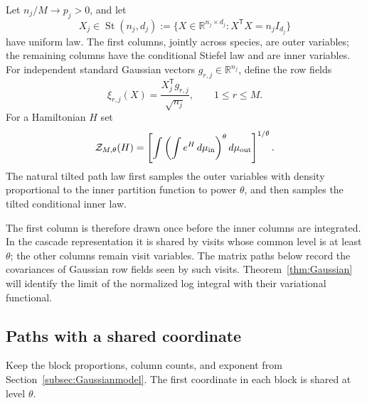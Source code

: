 \documentclass[11pt]{article}
\numberwithin{equation}{section}
\theoremstyle{definition}
\newcommand{\R}{\mathbb R}
\newcommand{\St}{\operatorname{St}}
\newcommand{\calZ}{\mathcal Z}
\begin{document}
Let $n_j/M\to p_j>0$, and let
\[
X_j\in\St(n_j,d_j):=\{X\in\R^{n_j\times d_j}:X^{\mathsf T}X=n_jI_{d_j}\}
\]
have uniform law. The first columns, jointly across species, are outer variables; the remaining columns have the conditional Stiefel law and are inner variables. For independent standard Gaussian vectors $g_{r,j}\in\R^{n_j}$, define the row fields
\[
\xi_{r,j}(X)=\frac{X_j^{\mathsf T}g_{r,j}}{\sqrt{n_j}},\qquad 1\le r\le M.
\]
For a Hamiltonian $H$ set
\begin{equation}\label{eq:poweredZ}
\calZ_{M,\theta}(H)=
\left[\int\left(\int e^H\,d\mu_{\rm in}\right)^\theta d\mu_{\rm out}\right]^{1/\theta}.
\end{equation}
The natural tilted path law first samples the outer variables with density proportional to the inner partition function to power $\theta$, and then samples the tilted conditional inner law.

The first column is therefore drawn once before the inner columns are integrated. In the cascade representation it is shared by visits whose common level is at least $\theta$; the other columns remain visit variables. The matrix paths below record the covariances of Gaussian row fields seen by such visits. Theorem~\ref{thm:Gaussian} will identify the limit of the normalized log integral with their variational functional.

\subsection{Paths with a shared coordinate}
Keep the block proportions, column counts, and exponent from Section~\ref{subsec:Gaussianmodel}. The first coordinate in each block is shared at level $\theta$.
\end{document}
